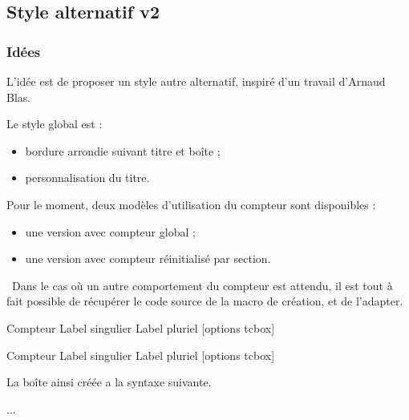 \documentclass[french,11pt,a4paper]{article}
\begin{document}
\subsection{Style alternatif v2}

\subsubsection{Idées}

L'idée est de proposer un style autre alternatif, inspiré d'un travail d'\textsf{Arnaud Blas}.

Le style global est :

\begin{itemize}
  \item bordure arrondie suivant titre et boîte ;
  \item personnalisation du titre.
\end{itemize}

Pour le moment, deux modèles d'utilisation du compteur sont disponibles :

\begin{itemize}
  \item une version avec compteur global ;
  \item une version avec compteur réinitialisé par section.
\end{itemize}

{\footnotesize \faBomb}~Dans le cas où un autre comportement du compteur est attendu, il est tout à fait possible de récupérer le code source de la macro de création, et de l'adapter.

\begin{codehigh}[language=latex/latex2,style/main=cyan!10,style/code=cyan!10]
%
  {Compteur}%
  {Label singulier}
  {Label pluriel}
  [options tcbox]

%
  {Compteur}%
  {Label singulier}
  {Label pluriel}
  [options tcbox]
\end{codehigh}

La boîte ainsi créée a la syntaxe suivante.

\begin{codehigh}[language=latex/latex2,style/main=cyan!10,style/code=cyan!10]
\begin{monenvt}[clés]
  ...
\end{monenvt}

\end{codehigh}
\end{document}
